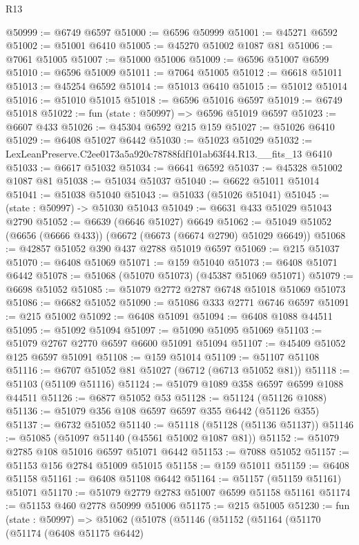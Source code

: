 \begin{lexlean}{R13}
\begin{coremodule}
@50999 := @6749 @6597
@51000 := @6596 @50999
@51001 := @45271 @6592
@51002 := @51001 @6410
@51005 := @45270 @51002 @1087 @81
@51006 := @7061 @51005
@51007 := @51000 @51006
@51009 := @6596 @51007 @6599
@51010 := @6596 @51009
@51011 := @7064 @51005
@51012 := @6618 @51011
@51013 := @45254 @6592
@51014 := @51013 @6410
@51015 := @51012 @51014
@51016 := @51010 @51015
@51018 := @6596 @51016 @6597
@51019 := @6749 @51018
@51022 := fun (state : @50997) => @6596 @51019 @6597
@51023 := @6607 @433
@51026 := @45304 @6592 @215 @159
@51027 := @51026 @6410
@51029 := @6408 @51027 @6442
@51030 := @51023 @51029
@51032 := LexLeanPreserve.C2ee0173a5a920c78788fdf101ab63f44.R13.__fits_13 @6410
@51033 := @6617 @51032
@51034 := @6641 @6592
@51037 := @45328 @51002 @1087 @81
@51038 := @51034 @51037
@51040 := @6622 @51011 @51014
@51041 := @51038 @51040
@51043 := @51033 (@51026 @51041)
@51045 := (state : @50997) -> @51030 @51043
@51049 := @6631 @433 @51029 @51043 @2790
@51052 := @6639 (@6646 @51027) @6649
@51062 := @51049 @51052 (@6656 (@6666 @433)) (@6672 (@6673 (@6674 @2790) @51029 @6649))
@51068 := @42857 @51052 @390 @437 @2788 @51019 @6597
@51069 := @215 @51037
@51070 := @6408 @51069
@51071 := @159 @51040
@51073 := @6408 @51071 @6442
@51078 := @51068 (@51070 @51073) (@45387 @51069 @51071)
@51079 := @6698 @51052
@51085 := @51079 @2772 @2787 @6748 @51018 @51069 @51073
@51086 := @6682 @51052
@51090 := @51086 @333 @2771 @6746 @6597
@51091 := @215 @51002
@51092 := @6408 @51091
@51094 := @6408 @1088 @44511
@51095 := @51092 @51094
@51097 := @51090 @51095 @51069
@51103 := @51079 @2767 @2770 @6597 @6600 @51091 @51094
@51107 := @45409 @51052 @125 @6597 @51091
@51108 := @159 @51014
@51109 := @51107 @51108
@51116 := @6707 @51052 @81 @51027 (@6712 (@6713 @51052 @81))
@51118 := @51103 (@51109 @51116)
@51124 := @51079 @1089 @358 @6597 @6599 @1088 @44511
@51126 := @6877 @51052 @53
@51128 := @51124 (@51126 @1088)
@51136 := @51079 @356 @108 @6597 @6597 @355 @6442 (@51126 @355)
@51137 := @6732 @51052
@51140 := @51118 (@51128 (@51136 @51137))
@51146 := @51085 (@51097 @51140 (@45561 @51002 @1087 @81))
@51152 := @51079 @2785 @108 @51016 @6597 @51071 @6442
@51153 := @7088 @51052
@51157 := @51153 @156 @2784 @51009 @51015
@51158 := @159 @51011
@51159 := @6408 @51158
@51161 := @6408 @51108 @6442
@51164 := @51157 (@51159 @51161) @51071
@51170 := @51079 @2779 @2783 @51007 @6599 @51158 @51161
@51174 := @51153 @460 @2778 @50999 @51006
@51175 := @215 @51005
@51230 := fun (state : @50997) =>
  @51062
    (@51078
      (@51146
        (@51152
          (@51164
            (@51170
              (@51174
                (@6408 @51175 @6442)

\end{coremodule}
\end{lexlean}
